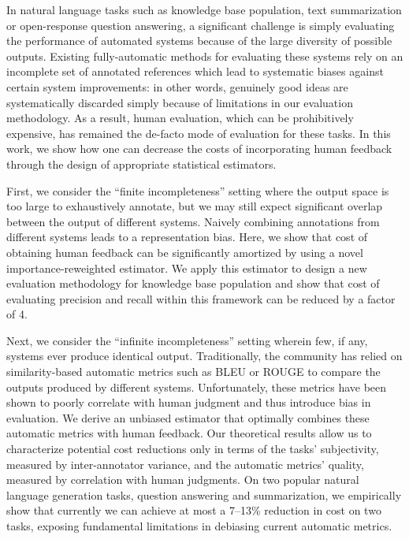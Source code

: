 In natural language tasks such as knowledge base population, text summarization or open-response question answering, a significant challenge is simply evaluating the performance of automated systems because of the large diversity of possible outputs.
Existing fully-automatic methods for evaluating these systems rely on an incomplete set of annotated references which lead to systematic biases against certain system improvements: in other words, genuinely good ideas are systematically discarded simply because of limitations in our evaluation methodology.
As a result, human evaluation, which can be prohibitively expensive, has remained the de-facto mode of evaluation for these tasks.
In this work, we show how one can decrease the costs of incorporating human feedback through the design of appropriate statistical estimators. 
%

First, we consider the ``finite incompleteness'' setting where the output space is too large to exhaustively annotate, but we may still expect significant overlap between the output of different systems. 
Naively combining annotations from different systems leads to a representation bias.
Here, we show that cost of obtaining human feedback can be significantly amortized by using a novel importance-reweighted estimator.  
We apply this estimator to design a new evaluation methodology for knowledge base population and show that cost of evaluating precision and recall within this framework can be reduced by a factor of 4.

Next, we consider the ``infinite incompleteness'' setting wherein few, if any, systems ever produce identical output.
Traditionally, the community has relied on similarity-based automatic metrics such as BLEU or ROUGE to compare the outputs produced by different systems.
Unfortunately, these metrics have been shown to poorly correlate with human judgment and thus introduce bias in evaluation.
We derive an unbiased estimator that optimally combines these automatic metrics with human feedback.
Our theoretical results allow us to characterize potential cost reductions only in terms of the tasks' subjectivity, measured by inter-annotator variance, and the automatic metrics' quality, measured by correlation with human judgments.
On two popular natural language generation tasks, question answering and summarization, we empirically show that currently we can achieve at most a 7--13\% reduction in cost on two tasks, exposing fundamental limitations in debiasing current automatic metrics.

